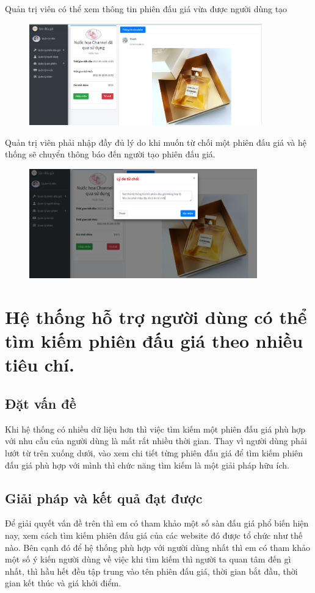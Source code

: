 \documentclass[../DoAn.tex]{subfiles}
\begin{document}
Quản trị viên có thể xem thông tin phiên đấu giá vừa được người dùng tạo
\begin{figure}[H]
    \centering
    \includegraphics[width=0.75\linewidth,height=4.41cm]{Hinhve/adminconfirm.png}
\end{figure}
Quản trị viên phải nhập đầy đủ lý do khi muốn từ chối một phiên đấu giá và hệ thống sẽ chuyển thông báo đến người tạo phiên đấu giá.
\begin{figure}[H]
    \centering
    \includegraphics[width=0.75\linewidth,height=4.74cm]{Hinhve/adminreject.png}
\end{figure}
\section{Hệ thống hỗ trợ người dùng có thể tìm kiếm phiên đấu giá theo nhiều tiêu chí.}
\subsection{Đặt vấn đề}
Khi hệ thống có nhiều dữ liệu hơn thì việc tìm kiếm một phiên đấu giá phù hợp với nhu cầu của người dùng là mất rất nhiều thời gian. Thay vì người dùng phải lướt từ trên xuống dưới, vào xem chi tiết từng phiên đấu giá để tìm kiếm phiên đấu giá phù hợp với mình thì chức năng tìm kiếm là một giải pháp hữu ích.
\subsection{Giải pháp và kết quả đạt được}
Để giải quyết vấn đề trên thì em có tham khảo một số sàn đấu giá phổ biến hiện nay, xem cách tìm kiếm phiên đấu giá của các website đó được tổ chức như thế nào. Bên cạnh đó để hệ thống phù hợp với người dùng nhất thì em có tham khảo một số ý kiến người dùng về việc khi tìm kiếm thì người ta quan tâm đến gì nhất, thì hầu hết đều tập trung vào tên phiên đấu giá, thời gian bắt đầu, thời gian kết thúc và giá khởi điểm. 
\end{document}
